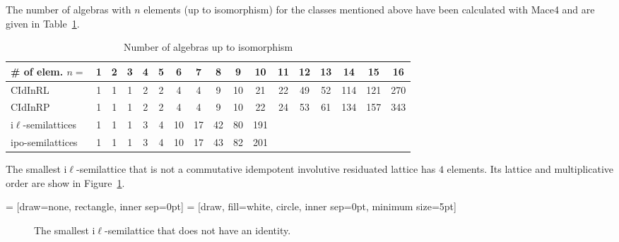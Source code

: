\documentclass[12pt]{amsart}
\begin{document}
The number of algebras with $n$ elements (up to isomorphism) for the classes mentioned above have been calculated with Mace4 \cite{McC2010} and are given in Table~\ref{size-n}.

\begin{table}
\begin{tabular}{l|cccccccccccccccc}
\# of elem. $n=$   &1&2&3&4&5& 6& 7& 8& 9&10&11&12&13&14&15&16\\\hline
CIdInRL       &1&1&1&2&2& 4& 4& 9&10&21&22&49&52&114&121&270\\
CIdInRP       &1&1&1&2&2& 4& 4& 9&10&22&24&53&61&134&157&343\\
i$\ell$-semilattices  &1&1&1&3&4&10&17&42&80&191&&&&&&\\
ipo-semilattices      &1&1&1&3&4&10&17&43&82&201&&&&&&\\
\end{tabular}

\medskip

\caption{Number of algebras up to isomorphism}\label{size-n}
\end{table}

The smallest i$\ell$-semilattice that is not a commutative idempotent involutive residuated lattice has $4$ elements. Its lattice and multiplicative order are show in Figure~\ref{cidil}.

 = [draw=none, rectangle, inner sep=0pt] %
 = [draw, fill=white, circle, inner sep=0pt, minimum size=5pt]
\begin{figure}[h!]
\begin{center}
\qquad \qquad
{}
\end{center}
\caption{The smallest i$\ell$-semilattice that does not have an identity.}\label{cidil}
\end{figure}
\end{document}
